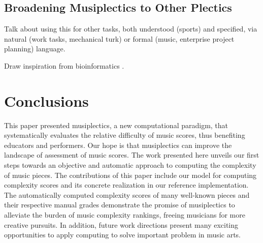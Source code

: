 \documentclass[12pt]{report}
\begin{document}
\section{Broadening Musiplectics to Other Plectics}
\label{sec:broad}

Talk about using this for other tasks, both understood (sports) and specified, via natural (work tasks, mechanical turk) or formal (music, enterprise project planning) language.

Draw inspiration from bioinformatics \cite{genomePub} \cite{genomePri}.

\chapter{Conclusions} 
\label{sec:conclu}

This paper presented musiplectics, a new computational paradigm, that systematically evaluates the relative difficulty of music scores, thus benefiting educators and performers. Our hope is that musiplectics can improve the landscape of assessment of music scores. The work presented here unveils our first steps towards an objective and automatic approach to computing the complexity of music pieces. The contributions of this paper include our model for computing complexity scores and its concrete realization in our reference implementation. The automatically computed complexity scores of many well-known pieces and their respective manual grades demonstrate the promise of musiplectics to alleviate the burden of music complexity rankings, freeing musicians for more creative pursuits. In addition, future work directions present many exciting opportunities to apply computing to solve important problem in music arts.

%
%

%

\end{document}

